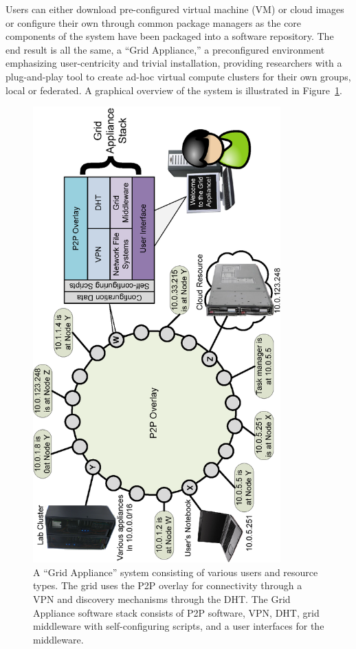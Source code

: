 \documentclass[conference]{IEEEtran}
\begin{document}
Users can either download pre-configured virtual machine (VM) or cloud images
or configure their own through common package managers as the core components
of the system have been packaged into a software repository.  The end result is
all the same, a ``Grid Appliance,'' a preconfigured environment emphasizing
user-centricity and trivial installation, providing researchers with a
plug-and-play tool to create ad-hoc virtual compute clusters for their own
groups, local or federated.  A graphical overview of the system is illustrated
in Figure~\ref{fig:appliance}.

\begin{figure}[ht]
\centering
\includegraphics[width=3.75in,angle=-90]{figs/appliance_overlays.eps}
\caption{A ``Grid Appliance'' system consisting of various users and resource
types.  The grid uses the P2P overlay for connectivity through a VPN and
discovery mechanisms through the DHT.  The Grid Appliance software stack
consists of P2P software, VPN, DHT, grid middleware with self-configuring
scripts, and a user interfaces for the middleware.}
\label{fig:appliance}
\end{figure}
\end{document}
